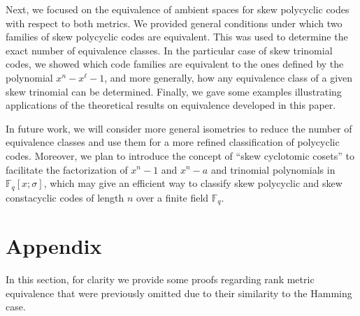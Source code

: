 \documentclass[12pt,paper]{article}
\theoremstyle{plain}
\newcommand{\Fq}{\mathbb{F}_{q}}
\begin{document}
Next, we focused on the equivalence of ambient spaces for skew polycyclic codes with respect to both metrics. We provided general conditions under which two families of skew polycyclic codes are equivalent. This was used to determine the exact number of equivalence classes. In the particular case of skew trinomial codes, we showed which code families are equivalent to the ones defined by the polynomial $x^n-x^\ell -1$, and more generally, how any equivalence class of a given skew trinomial can be determined. Finally, we gave some examples illustrating applications of the theoretical results on equivalence developed in this paper.

In future work, we will consider more general isometries to reduce the number of equivalence classes and use them for a more refined classification of polycyclic codes. Moreover, we plan to introduce the concept of ``skew cyclotomic cosets'' to facilitate the factorization of $x^n-1$ and $x^n-a$ and trinomial polynomials in $\mathbb{F}_q[x;\sigma]$, which may give an efficient way to classify skew polycyclic and skew constacyclic  codes of length $n$ over a finite field $\Fq$. 



\printbibliography


\section{Appendix}
In this section, for clarity we provide some proofs regarding rank metric equivalence that were previously omitted due to their similarity to the Hamming case. 
\end{document}
